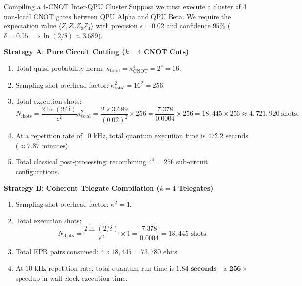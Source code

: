 \begin{examplebox}{Compiling a 4-CNOT Inter-QPU Cluster}
Suppose we must execute a cluster of 4 non-local CNOT gates between QPU Alpha and QPU Beta. We require the expectation value $\langle Z_1 Z_2 Z_3 Z_4 \rangle$ with precision $\epsilon = 0.02$ and confidence $95\%$ ($\delta = 0.05 \implies \ln(2/\delta) \approx 3.689$).

\textbf{Strategy A: Pure Circuit Cutting ($k = 4$ CNOT Cuts)}
\begin{enumerate}
    \item Total quasi-probability norm: $\kappa_{\text{total}} = \kappa_{\text{CNOT}}^4 = 2^4 = 16$.
    \item Sampling shot overhead factor: $\kappa_{\text{total}}^2 = 16^2 = 256$.
    \item Total execution shots:
    \begin{equation}
        N_{\text{shots}} = \frac{2 \ln(2/\delta)}{\epsilon^2} \kappa_{\text{total}}^2 = \frac{2 \times 3.689}{(0.02)^2} \times 256 = \frac{7.378}{0.0004} \times 256 = 18{,}445 \times 256 \approx 4{,}721{,}920 \text{ shots}.
    \end{equation}
    \item At a repetition rate of $10\text{ kHz}$, total quantum execution time is $472.2\text{ seconds}$ ($\approx 7.87\text{ minutes}$).
    \item Total classical post-processing: recombining $4^4 = 256$ sub-circuit configurations.
\end{enumerate}

\textbf{Strategy B: Coherent Telegate Compilation ($k = 4$ Telegates)}
\begin{enumerate}
    \item Sampling shot overhead factor: $\kappa^2 = 1$.
    \item Total execution shots:
    \begin{equation}
        N_{\text{shots}} = \frac{2 \ln(2/\delta)}{\epsilon^2} \times 1 = \frac{7.378}{0.0004} = 18{,}445 \text{ shots}.
    \end{equation}
    \item Total EPR pairs consumed: $4 \times 18{,}445 = 73{,}780\text{ ebits}$.
    \item At $10\text{ kHz}$ repetition rate, total quantum run time is $\mathbf{1.84\text{ seconds}}$---a $\mathbf{256\times}$ speedup in wall-clock execution time.
\end{enumerate}
\end{examplebox}

